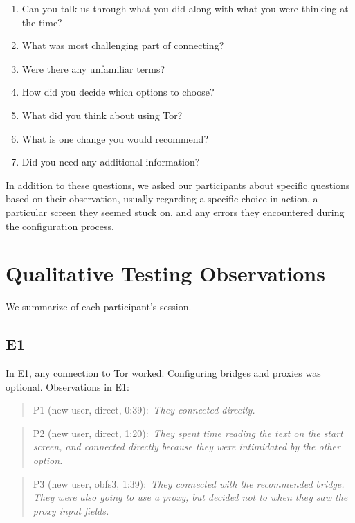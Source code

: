 \documentclass[USenglish,oneside,twocolumn]{article}
\newcommand{\pquote}[2]{
\begin{quotation}
\noindent #1:~\textit{#2}
\end{quotation}
}
\begin{document}
\begin{enumerate}
\item{Can you talk us through what you did along with what you were thinking at the time?}
\item{What was most challenging part of connecting?}
\item{Were there any unfamiliar terms?}
\item{How did you decide which options to choose?}
\item{What did you think about using Tor?}
\item{What is one change you would recommend?} 
\item{Did you need any additional information?} 
\end{enumerate}  

In addition to these questions, we asked our participants about specific questions based on their observation, usually regarding a specific choice in action, a particular screen they seemed stuck on, and any errors they encountered during the configuration process. 

\section{Qualitative Testing Observations}
\label{summary}
We summarize of each participant's session.



\subsection{E1} 
In E1, any connection to Tor worked. Configuring bridges and proxies was optional.  
Observations in E1: 

\pquote{P1 (new user, direct, 0:39)}{They connected directly.}

\pquote{P2 (new user, direct, 1:20)}{They spent time reading the text on the start screen, and connected directly because they were intimidated by the other option.}

\pquote{P3 (new user, obfs3, 1:39)}{They connected with the recommended bridge. They were also going to use a proxy, but decided not to when they saw the proxy input fields.}
\end{document}
